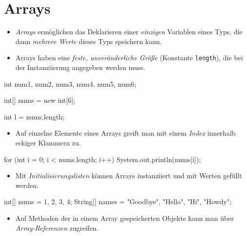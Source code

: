 \documentclass[a4paper,10pt, dvipsnames]{report}
\begin{document}
\section{Arrays}

\begin{itemize}
	\item \textit{Arrays} ermöglichen das Deklarieren einer \textit{einzigen} Variablen eines Typs, die dann \textit{mehrere Werte} dieses Typs speichern kann.
	\item Arrays haben eine \textit{feste, unveränderliche Größe} (Konstante \texttt{length}), die bei der Instanziierung angegeben werden muss.
\end{itemize}

\begin{javacodebox}
int num1, num2, num3, num4, num5, num6;
\end{javacodebox}

\begin{javacodebox}
int[] nums = new int[6];
\end{javacodebox}

\begin{javacodebox}
int l = nums.length;
\end{javacodebox}

\begin{itemize}
	\item Auf einzelne Elemente eines Arrays greift man mit einem \textit{Index} innerhalb eckiger Klammern zu.
\end{itemize}

\begin{javacodebox}
for (int i = 0; i < nums.length; i++) {
	System.out.println(nums[i]);
}
\end{javacodebox}

\begin{itemize}
	\item Mit \textit{Initialisierungslisten} können Arrays instanziiert und mit Werten gefüllt werden.
\end{itemize}

\begin{javacodebox}
int[] nums = {1, 2, 3, 4};
String[] names = {"Goodbye", "Hello", "Hi", "Howdy"};
\end{javacodebox}

\begin{itemize}
	\item Auf Methoden der in einem Array gespeicherten Objekte kann man über \textit{Array-Referenzen} zugreifen.
\end{itemize}
\end{document}
